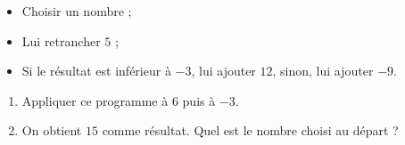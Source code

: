 
\begin{exercice}\label{exo2smath-0220}

    \begin{itemize}
        \item 
Choisir un nombre ;
\item
Lui retrancher $5$ ;
\item
Si le résultat est inférieur à \( -3\), lui ajouter \( 12\), sinon, lui ajouter \( -9\).
    \end{itemize}

    \begin{enumerate}
        \item
Appliquer ce programme à $6$ puis à \( -3\).
\item
 On obtient $15$ comme résultat. Quel est le nombre choisi au départ ?
    \end{enumerate}

\end{exercice}
